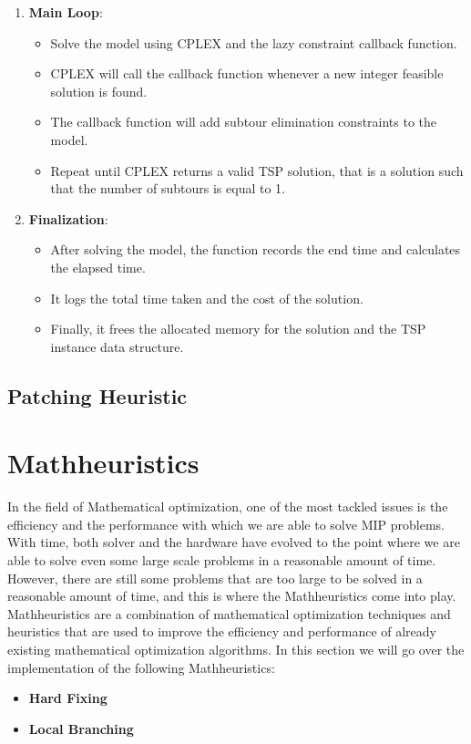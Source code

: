 \documentclass{article}
\begin{document}
\begin{enumerate}
\begin{lstlisting}[language=C]
	\end{lstlisting}
	\item \textbf{Main Loop}:
	\begin{itemize}
		\item Solve the model using CPLEX and the lazy constraint callback function.
		\item CPLEX will call the callback function whenever a new integer feasible solution is found.
		\item The callback function will add subtour elimination constraints to the model.
		\item Repeat until CPLEX returns a valid TSP solution, that is a solution such that the number of subtours is equal to 1.
	\end{itemize}
	\item \textbf{Finalization}:
	\begin{itemize}
		\item After solving the model, the function records the end time and calculates the elapsed time.
		\item It logs the total time taken and the cost of the solution.
		\item Finally, it frees the allocated memory for the solution and the TSP instance data structure.
	\end{itemize}
\end{enumerate}

\subsection{Patching Heuristic}


\section{Mathheuristics}
In the field of Mathematical optimization, one of the most tackled issues is the efficiency and the performance with which
we are able to solve MIP problems. With time, both solver and the hardware have evolved to the point where we are able to solve even some large scale problems 
in a reasonable amount of time. However, there are still some problems that are too large to be solved in a reasonable amount of time, and this is where the Mathheuristics 
come into play. Mathheuristics are a combination of mathematical optimization techniques and heuristics that are used to improve the efficiency and performance of 
already existing mathematical optimization algorithms.\cite{Fischetti2003LocalBranching}\cite{Fischetti2016Matheuristics} 
In this section we will go over the implementation of the following Mathheuristics:
\begin{itemize}
	\item \textbf{Hard Fixing}
	\item \textbf{Local Branching}
\end{itemize}
\end{document}
